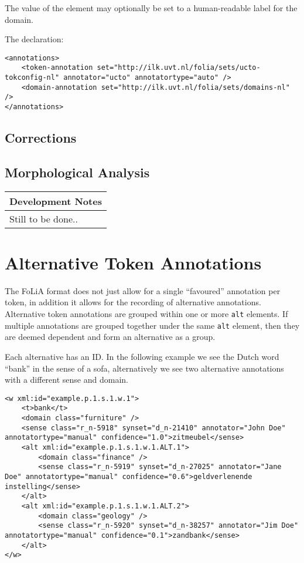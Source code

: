 \documentclass[a4paper,12pt]{article}
\newenvironment{devnotes}
{\newpage
\begin{center}
    \begin{tabular}[h!]{|p{0.8\textwidth}|}
    \hline
    {\bf Development Notes}\\\hline}
{   \\\hline
    \end{tabular}
\end{center}}
\begin{document}
The value of the element may optionally be set to a human-readable label for the domain.

The declaration:

\begin{verbatim}
<annotations>
    <token-annotation set="http://ilk.uvt.nl/folia/sets/ucto-tokconfig-nl" annotator="ucto" annotatortype="auto" />
    <domain-annotation set="http://ilk.uvt.nl/folia/sets/domains-nl" />
</annotations>
\end{verbatim}

\subsection{Corrections}




\subsection{Morphological Analysis}

\begin{devnotes}
Still to be done..
\end{devnotes}


\section{Alternative Token Annotations}

The FoLiA format does not just allow for a single ``favoured'' annotation per token, in addition it allows for the recording of alternative annotations. Alternative token annotations are grouped within one or more \texttt{alt} elements. If multiple annotations are grouped together under the same \texttt{alt} element, then they are deemed dependent and form an alternative as a group.

Each alternative has an ID. In the following example we see the Dutch word ``bank'' in the sense of a sofa, alternatively we see two alternative annotations with a different sense and domain.

\begin{verbatim}
<w xml:id="example.p.1.s.1.w.1">
    <t>bank</t>
    <domain class="furniture" />
    <sense class="r_n-5918" synset="d_n-21410" annotator="John Doe" annotatortype="manual" confidence="1.0">zitmeubel</sense>
    <alt xml:id="example.p.1.s.1.w.1.ALT.1">
        <domain class="finance" />
        <sense class="r_n-5919" synset="d_n-27025" annotator="Jane Doe" annotatortype="manual" confidence="0.6">geldverlenende instelling</sense>        
    </alt>
    <alt xml:id="example.p.1.s.1.w.1.ALT.2">
        <domain class="geology" />
        <sense class="r_n-5920" synset="d_n-38257" annotator="Jim Doe" annotatortype="manual" confidence="0.1">zandbank</sense>        
    </alt>    
</w>
\end{verbatim}
\end{document}
